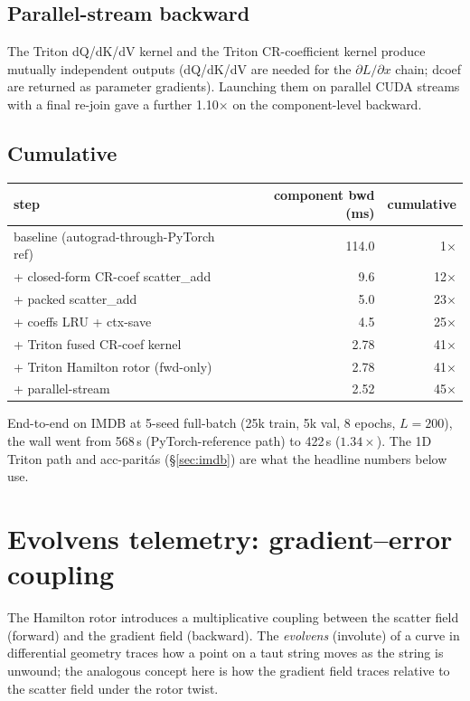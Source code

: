 \documentclass[10pt,a4paper]{article}
\begin{document}
\subsection{Parallel-stream backward}

The Triton dQ/dK/dV kernel and the Triton CR-coefficient kernel
produce mutually independent outputs (dQ/dK/dV are needed for the
$\partial L / \partial x$ chain; dcoef are returned as parameter
gradients). Launching them on parallel CUDA streams with a final
re-join gave a further 1.10$\times$ on the component-level backward.

\subsection{Cumulative}

\begin{center}
\begin{tabular}{lrr}
\toprule
step & component bwd (ms) & cumulative \\
\midrule
baseline (autograd-through-PyTorch ref) & 114.0 & 1$\times$ \\
+ closed-form CR-coef scatter\_add      & 9.6   & 12$\times$ \\
+ packed scatter\_add                   & 5.0   & 23$\times$ \\
+ coeffs LRU + ctx-save                 & 4.5   & 25$\times$ \\
+ Triton fused CR-coef kernel           & 2.78  & 41$\times$ \\
+ Triton Hamilton rotor (fwd-only)      & 2.78  & 41$\times$ \\
+ parallel-stream                       & 2.52  & 45$\times$ \\
\bottomrule
\end{tabular}
\end{center}

\noindent
End-to-end on IMDB at 5-seed full-batch (25k train, 5k val, 8 epochs,
$L=200$), the wall went from 568\,s (PyTorch-reference path) to
422\,s ($1.34\times$). The 1D Triton path and acc-paritás (\S\ref{sec:imdb})
are what the headline numbers below use.

\section{Evolvens telemetry: gradient--error coupling}

The Hamilton rotor introduces a multiplicative coupling between the
scatter field (forward) and the gradient field (backward). The
\emph{evolvens} (involute) of a curve in differential geometry traces
how a point on a taut string moves as the string is unwound; the
analogous concept here is how the gradient field traces relative to
the scatter field under the rotor twist.
\end{document}
